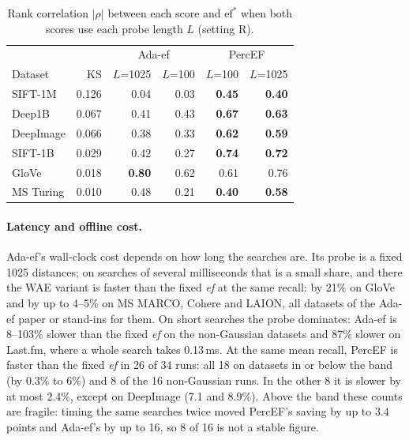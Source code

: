 \documentclass[sigconf,anonymous]{acmart}
\newcommand{\ef}{\textit{ef}}
\begin{document}
\begin{table}[t]
  \caption{Rank correlation $|\rho|$ between each score and $\mathrm{ef}^*$ when both scores use
  each probe length $L$ (setting R).}
  \label{tab:ablation}
  \centering\footnotesize
  \begin{tabular}{lrrrrr}
    \toprule
    & & \multicolumn{2}{c}{Ada-ef} & \multicolumn{2}{c}{PercEF} \\
    Dataset & KS & $L$=1025 & $L$=100 & $L$=100 & $L$=1025 \\
    \midrule
    SIFT-1M   & 0.126 & 0.04 & 0.03 & \textbf{0.45} & \textbf{0.40} \\
    Deep1B    & 0.067 & 0.41 & 0.43 & \textbf{0.67} & \textbf{0.63} \\
    DeepImage & 0.066 & 0.38 & 0.33 & \textbf{0.62} & \textbf{0.59} \\
    SIFT-1B   & 0.029 & 0.42 & 0.27 & \textbf{0.74} & \textbf{0.72} \\
    GloVe     & 0.018 & \textbf{0.80} & 0.62 & 0.61 & 0.76 \\
    MS Turing & 0.010 & 0.48 & 0.21 & \textbf{0.40} & \textbf{0.58} \\
    \bottomrule
  \end{tabular}
\end{table}

\paragraph{Latency and offline cost.}\label{sec:latency}
Ada-ef's wall-clock cost depends on how long the searches are. Its probe is a fixed 1025 distances;
on searches of several milliseconds that is a small share, and there the WAE variant is faster than
the fixed \ef{} at the same recall: by 21\% on GloVe and by up to 4--5\% on MS MARCO, Cohere and
LAION, all datasets of the Ada-ef paper or stand-ins for them. On short searches the probe dominates:
Ada-ef is 8--103\% slower than the fixed \ef{} on the non-Gaussian datasets and 87\% slower on
Last.fm, where a whole search takes 0.13\,ms. At the same mean recall, PercEF is faster than the
fixed \ef{} in 26 of 34 runs: all 18 on datasets in or below the band (by 0.3\% to 6\%) and 8 of
the 16 non-Gaussian runs. In the other 8 it is slower by at most 2.4\%, except on DeepImage (7.1
and 8.9\%). Above the band these counts are fragile: timing the same searches twice moved PercEF's
saving by up to 3.4 points and Ada-ef's by up to 16, so 8 of 16 is not a stable figure.
\end{document}
